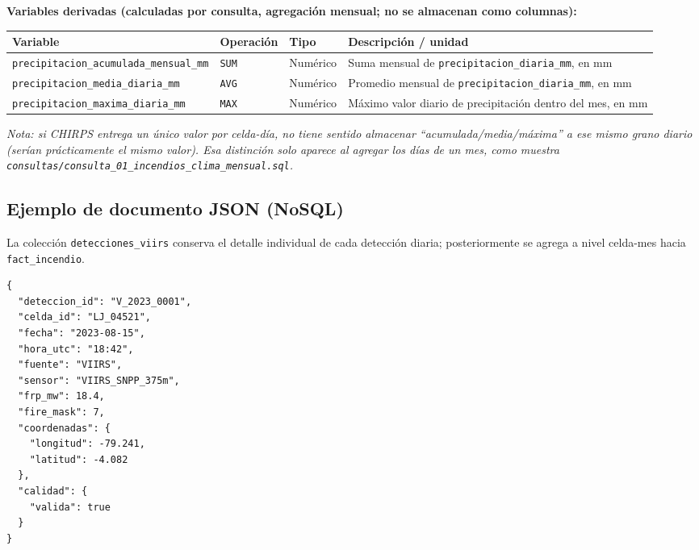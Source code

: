 \documentclass[11pt,a4paper]{article}
\begin{document}
\vspace{0.2cm}
\noindent\textbf{Variables derivadas (calculadas por consulta, agregaci\'on mensual; no se almacenan como columnas):}

\begin{center}
\footnotesize
\begin{tabular}{@{}L{5.4cm}L{2.1cm}L{1.3cm}L{5.1cm}@{}}
\toprule
\textbf{Variable} & \textbf{Operaci\'on} & \textbf{Tipo} & \textbf{Descripci\'on / unidad} \\
\midrule
\texttt{precipitacion\_acumulada\_\allowbreak mensual\_mm} & \texttt{SUM} & Num\'erico & Suma mensual de \texttt{precipitacion\_diaria\_mm}, en mm \\[2pt]
\texttt{precipitacion\_media\_diaria\_mm} & \texttt{AVG} & Num\'erico & Promedio mensual de \texttt{precipitacion\_diaria\_mm}, en mm \\[2pt]
\texttt{precipitacion\_maxima\_diaria\_mm} & \texttt{MAX} & Num\'erico & M\'aximo valor diario de precipitaci\'on dentro del mes, en mm \\
\bottomrule
\end{tabular}
\end{center}

\noindent\footnotesize\textit{Nota: si CHIRPS entrega un \'unico valor por celda-d\'ia, no tiene sentido almacenar \textquotedblleft acumulada/media/m\'axima\textquotedblright{} a ese mismo grano diario (ser\'ian pr\'acticamente el mismo valor). Esa distinci\'on solo aparece al agregar los d\'ias de un mes, como muestra \texttt{consultas/consulta\_01\_incendios\_clima\_mensual.sql}.}\normalsize

\subsection{Ejemplo de documento JSON (NoSQL)}

La colecci\'on \texttt{detecciones\_viirs} conserva el detalle individual de cada detecci\'on diaria; posteriormente se agrega a nivel celda-mes hacia \texttt{fact\_incendio}.

\begin{footnotesize}
\begin{verbatim}
{
  "deteccion_id": "V_2023_0001",
  "celda_id": "LJ_04521",
  "fecha": "2023-08-15",
  "hora_utc": "18:42",
  "fuente": "VIIRS",
  "sensor": "VIIRS_SNPP_375m",
  "frp_mw": 18.4,
  "fire_mask": 7,
  "coordenadas": {
    "longitud": -79.241,
    "latitud": -4.082
  },
  "calidad": {
    "valida": true
  }
}
\end{verbatim}
\end{footnotesize}
\end{document}
